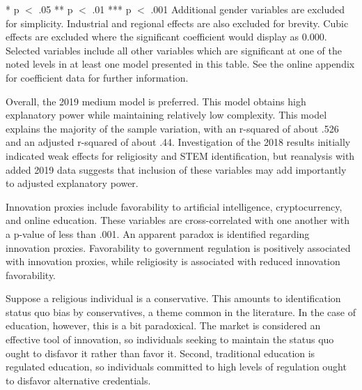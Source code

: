 \documentclass[AER]{./aea-latex-templates/AEA}
\begin{document}
\begin{table}
\begin{tabular}{lllll}
            \end{tabular}
            \begin{tablenotes}
                * p $<$ .05
                ** p $<$ .01
                *** p $<$ .001
                Additional gender variables are excluded for simplicity.
                Industrial and regional effects are also excluded for brevity.
                Cubic effects are excluded where the significant coefficient would display as 0.000.
                Selected variables include all other variables which are significant at one of the noted levels in at least one model presented in this table.
                See the online appendix for coefficient data for further information.
            \end{tablenotes}
            \label{tab:models}
            \end{table}
        
        Overall, the 2019 medium model is preferred. This model obtains high explanatory power while maintaining relatively low complexity.
        This model explains the majority of the sample variation, with an r-squared of about .526 and an adjusted r-squared of about .44.
        Investigation of the 2018 results initially indicated weak effects for religiosity and STEM identification,
        but reanalysis with added 2019 data suggests that inclusion of these variables may add importantly to adjusted explanatory power.
        
        Innovation proxies include favorability to artificial
        intelligence, cryptocurrency, and online education. These variables are
        cross-correlated with one another with a p-value of less than .001.
        An apparent paradox is identified regarding innovation proxies.
        Favorability to government regulation is positively associated with
        innovation proxies, while religiosity is associated with reduced
        innovation favorability.
        
        Suppose a religious individual is a conservative.
        This amounts to identification status quo bias
        by conservatives, a theme common in the literature\cite{eidelman2012bias}.
        In the case of education, however, this is a bit paradoxical.
        The market is considered an effective tool of innovation\cite{baumol2002free},
        so individuals seeking to maintain the status quo ought to disfavor it rather than favor it.
        Second, traditional education is regulated education,
        so individuals committed to high levels of regulation ought to disfavor
        alternative credentials.
\end{document}

